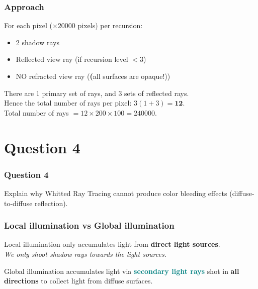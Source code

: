 \documentclass{beamer}
\begin{document}
\begin{frame}
    \frametitle{Approach}

    For each pixel ($\times 20000$ pixels) per recursion:

    \begin{itemize}
        \item 2 shadow rays
        \item Reflected view ray (if recursion level $<3$)
        \item NO refracted view ray (\textbf(all surfaces are opaque!))
    \end{itemize}

    There are 1 primary set of rays, and 3 sets of reflected rays.\\

    Hence the total number of rays per pixel: $3 (1 + 3) = \mathbf{12}$.\\

    Total number of rays $= 12 \times 200 \times 100 = 240000$.

\end{frame}

\section{Question 4}

\begin{frame}
    \frametitle{Question 4}
    Explain why Whitted Ray Tracing cannot produce color bleeding effects 
    (diffuse-to-diffuse reflection).
\end{frame}

\begin{frame}
    \frametitle{Local illumination vs Global illumination}

    Local illumination only accumulates light from \textbf{direct light sources}.\\
    \textit{We only shoot shadow rays towards the light sources.}

    \vspace{1em}

    Global illumination accumulates light via \textcolor{teal}{\textbf{secondary light rays}}
    shot in \textbf{all directions} to collect light from diffuse surfaces.

\end{frame}
\end{document}
